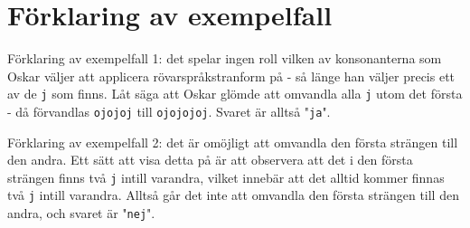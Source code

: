 \section*{Förklaring av exempelfall}
Förklaring av exempelfall 1: det spelar ingen roll vilken av konsonanterna som Oskar väljer att applicera rövarspråkstranform på - så länge
han väljer precis ett av de \texttt{j} som finns. Låt säga att Oskar glömde att omvandla alla \texttt{j} utom det första - då förvandlas \texttt{ojojoj} till \texttt{ojojojoj}. Svaret är alltså "\texttt{ja}".

Förklaring av exempelfall 2: det är omöjligt att omvandla den första strängen till den andra. Ett sätt att visa detta på är att observera att det i den första strängen finns två \texttt{j} intill varandra, vilket innebär att det alltid kommer finnas två \texttt{j} intill varandra. Alltså går det inte att omvandla den första strängen till den andra, och svaret är "\texttt{nej}".
